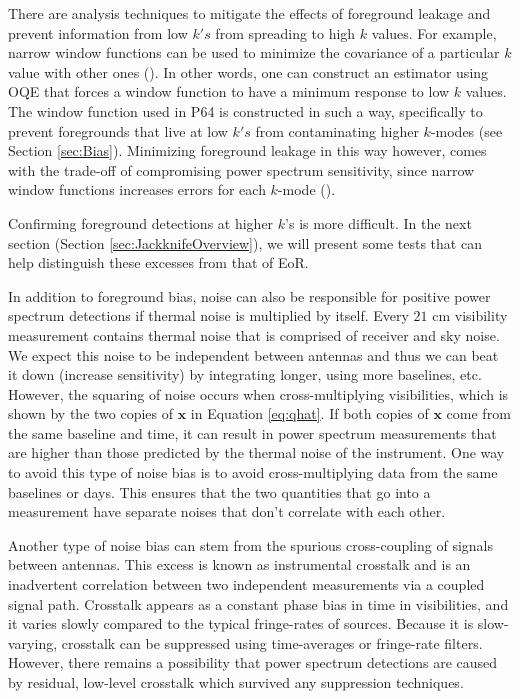 \documentclass[preprint2,numberedappendix,tighten]{aastex6}  %
\begin{document}
There are analysis techniques to mitigate the effects of foreground leakage and prevent information from low $k's$ from spreading to high $k$ values. For example, narrow window functions can be used to minimize the covariance of a particular $k$ value with other ones (\citealt{liu_et_al2014b}). In other words, one can construct an estimator using OQE that forces a window function to have a minimum response to low $k$ values. The window function used in P64 is constructed in such a way, specifically to prevent foregrounds that live at low $k's$ from contaminating higher $k$-modes (see Section \ref{sec:Bias}). Minimizing foreground leakage in this way however, comes with the trade-off of compromising power spectrum sensitivity, since narrow window functions increases errors for each $k$-mode (\citealt{liu_et_al2014b}). 

Confirming foreground detections at higher $k$'s is more difficult. In the next section (Section \ref{sec:JackknifeOverview}), we will present some tests that can help distinguish these excesses from that of EoR. 

In addition to foreground bias, noise can also be responsible for positive power spectrum detections if thermal noise is multiplied by itself. Every $21$ cm visibility measurement contains thermal noise that is comprised of receiver and sky noise. We expect this noise to be independent between antennas and thus we can beat it down (increase sensitivity) by integrating longer, using more baselines, etc. However, the squaring of noise occurs when cross-multiplying visibilities, which is shown by the two copies of $\textbf{x}$ in Equation \eqref{eq:qhat}. If both copies of $\textbf{x}$ come from the same baseline and time, it can result in power spectrum measurements that are higher than those predicted by the thermal noise of the instrument. One way to avoid this type of noise bias is to avoid cross-multiplying data from the same baselines or days. This ensures that the two quantities that go into a measurement have separate noises that don't correlate with each other. 

Another type of noise bias can stem from the spurious cross-coupling of signals between antennas. This excess is known as instrumental crosstalk and is an inadvertent correlation between two independent measurements via a coupled signal path. Crosstalk appears as a constant phase bias in time in visibilities, and it varies slowly compared to the typical fringe-rates of sources. Because it is slow-varying, crosstalk can be suppressed using time-averages or fringe-rate filters. However, there remains a possibility that power spectrum detections are caused by residual, low-level crosstalk which survived any suppression techniques. 
\end{document}
